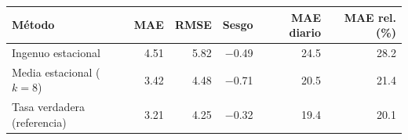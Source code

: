 \begin{tabular}{lrrrrr}
\toprule
Método & MAE & RMSE & Sesgo & MAE diario & MAE rel. (\%) \\
\midrule
Ingenuo estacional & \num{4.51} & \num{5.82} & \num{-0.49} & \num{24.5} & \num{28.2} \\
Media estacional ($k=8$) & \num{3.42} & \num{4.48} & \num{-0.71} & \num{20.5} & \num{21.4} \\
Tasa verdadera (referencia) & \num{3.21} & \num{4.25} & \num{-0.32} & \num{19.4} & \num{20.1} \\
\bottomrule
\end{tabular}
